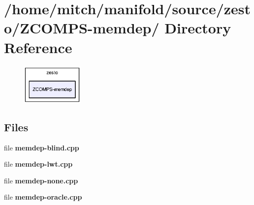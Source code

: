 \section{/home/mitch/manifold/source/zesto/ZCOMPS-memdep/ Directory Reference}
\label{dir_05dc7f01595554fb887e187698a0ab9b}


\nopagebreak
\begin{figure}[H]
\begin{center}
\leavevmode
\includegraphics[width=87pt]{dir_05dc7f01595554fb887e187698a0ab9b_dep}
\end{center}
\end{figure}
\subsection*{Files}
\begin{CompactItemize}
\item 
file {\bf memdep-blind.cpp}
\item 
file {\bf memdep-lwt.cpp}
\item 
file {\bf memdep-none.cpp}
\item 
file {\bf memdep-oracle.cpp}
\end{CompactItemize}
